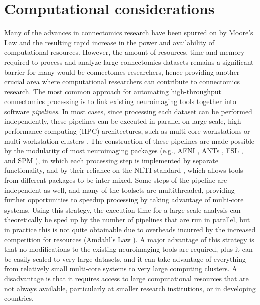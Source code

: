 \documentclass{bmcart}
\begin{document}
\section{Computational considerations}

Many of the advances in connectomics research have been spurred on by Moore's Law and the resulting rapid increase in the power and availability of computational resources. However, the amount of resources, time and memory required to process and analyze large connectomics datasets remains a significant barrier for many would-be connectomes researchers, hence providing another crucial area where computational researchers can contribute to connectomics research. The most common approach for automating high-throughput connectomics processing is to link existing neuroimaging tools together into software \emph{pipelines}. In most cases, since processing each dataset can be performed independently, these pipelines can be executed in parallel on large-scale, high-performance computing (HPC) architectures, such as multi-core workstations or multi-workstation clusters \cite{Dinov2010, Yan2010, Bellec2012, SLV2012, Gorgolewski2011, Craddock2013c}. The construction of these pipelines are made possible by the modularity of most neuroimaging packages (e.g., AFNI \cite{Cox1996}, ANTs \cite{Avants2008}, FSL \cite{Smith2004}, and SPM \cite{Friston1994b}), in which each processing step is implemented by separate functionality, and by their reliance on the NIfTI standard \cite{Cox2004}, which allows tools from different packages to be inter-mixed. Some steps of the pipeline are independent as well, and many of the toolsets are multithreaded, providing further opportunities to speedup processing by taking advantage of multi-core systems. Using this strategy, the execution time for a large-scale analysis can theoretically be sped up by the number of pipelines that are run in parallel, but in practice this is not quite obtainable due to overheads incurred by the increased competition for resources (Amdahl's Law \cite{Amdahl1967}). A major advantage of this strategy is that no modifications to the existing neuroimaging tools are required, plus it can be easily scaled to very large datasets, and it can take advantage of everything from relatively small multi-core systems to very large computing clusters. A disadvantage is that it requires access to large computational resources that are not always available, particularly at smaller research institutions, or in developing countries.
\end{document}
